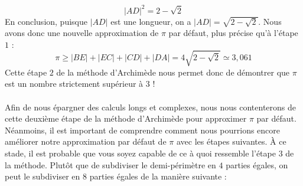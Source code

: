 \documentclass[a4paper,fontsize=13pt]{scrreprt}
\theoremstyle{plain}
\theoremstyle{definition}
\begin{document}
$${|AD|}^2 =2-\sqrt{2}$$
En conclusion, puisque $|AD|$ est une longueur, on a $|AD| = \sqrt{2-\sqrt{2}}$. Nous avons donc une nouvelle approximation de $\pi$ par défaut, plus précise qu'à l'étape $1$ :
$$\pi \ge |BE|+|EC|+|CD|+|DA| = 4\sqrt{2-\sqrt{2}} \simeq 3,061$$
Cette étape $2$ de la méthode d'Archimède nous permet donc de démontrer que $\pi$ est un nombre strictement supérieur à $3$ ! \\~\\
Afin de nous épargner des calculs longs et complexes, nous nous contenterons de cette deuxième étape de la méthode d'Archimède pour approximer $\pi$ par défaut. Néanmoins, il est important de comprendre comment nous pourrions encore améliorer notre approximation par défaut de $\pi$ avec les étapes suivantes. À ce stade, il est probable que vous soyez capable de ce à quoi ressemble l'étape $3$ de la méthode. Plutôt que de subdiviser le demi-périmètre en $4$ parties égales, on peut le subdiviser en $8$ parties égales de la manière suivante :
\end{document}
